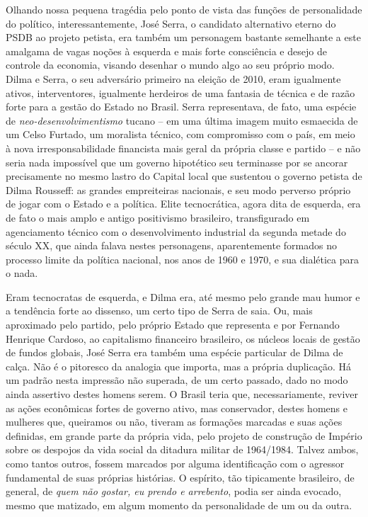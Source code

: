 Olhando nossa pequena tragédia pelo ponto de vista das funções de
personalidade do político, interessantemente, José Serra, o candidato
alternativo eterno do PSDB ao projeto petista, era também um personagem
bastante semelhante a este amalgama de vagas noções à esquerda e mais
forte consciência e desejo de controle da economia, visando desenhar o
mundo algo ao seu próprio modo. Dilma e Serra, o seu adversário primeiro
na eleição de 2010, eram igualmente ativos, interventores, igualmente
herdeiros de uma fantasia de técnica e de razão forte para a gestão do
Estado no Brasil. Serra representava, de fato, uma espécie de
\emph{neo-desenvolvimentismo} tucano -- em uma última imagem muito
esmaecida de um Celso Furtado, um moralista técnico, com compromisso com
o país, em meio à nova irresponsabilidade financista mais geral da
própria classe e partido -- e não seria nada impossível que um governo
hipotético seu terminasse por se ancorar precisamente no mesmo lastro do
Capital local que sustentou o governo petista de Dilma Rousseff: as
grandes empreiteiras nacionais, e seu modo perverso próprio de jogar com
o Estado e a política. Elite tecnocrática, agora dita de esquerda, era
de fato o mais amplo e antigo positivismo brasileiro, transfigurado em
agenciamento técnico com o desenvolvimento industrial da segunda metade
do século XX, que ainda falava nestes personagens, aparentemente
formados no processo limite da política nacional, nos anos de 1960 e
1970, e sua dialética para o nada.

Eram tecnocratas de esquerda, e Dilma era, até mesmo pelo grande mau
humor e a tendência forte ao dissenso, um certo tipo de Serra de saia.
Ou, mais aproximado pelo partido, pelo próprio Estado que representa e
por Fernando Henrique Cardoso, ao capitalismo financeiro brasileiro, os
núcleos locais de gestão de fundos globais, José Serra era também uma
espécie particular de Dilma de calça. Não é o pitoresco da analogia que
importa, mas a própria duplicação. Há um padrão nesta impressão não
superada, de um certo passado, dado no modo ainda assertivo destes
homens serem. O Brasil teria que, necessariamente, reviver as ações
econômicas fortes de governo ativo, mas conservador, destes homens e
mulheres que, queiramos ou não, tiveram as formações marcadas e suas
ações definidas, em grande parte da própria vida, pelo projeto de
construção de Império sobre os despojos da vida social da ditadura
militar de 1964/1984. Talvez ambos, como tantos outros, fossem marcados
por alguma identificação com o agressor fundamental de suas próprias
histórias. O espírito, tão tipicamente brasileiro, de general, de
\emph{quem não gostar, eu prendo e arrebento}, podia ser ainda evocado,
mesmo que matizado, em algum momento da personalidade de um ou da outra.

